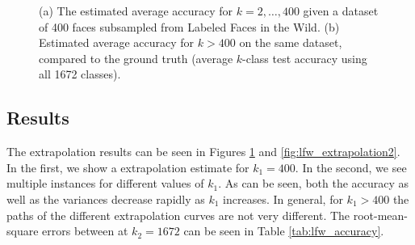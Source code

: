 \documentclass[twoside,11pt]{article}
\begin{document}
\begin{figure}
\begin{tabular}{cc}
\end{tabular}
\caption{(a) The estimated average accuracy for $k = 2,\hdots,
  400$ given a dataset of 400 faces subsampled from Labeled Faces in
  the Wild.  (b) Estimated average accuracy for $k > 400$ on the
  same dataset, compared to the ground truth (average $k$-class test accuracy
  using all 1672 classes).}
\label{fig:lfw_extrapolation1}
\end{figure}

\subsection{Results}

The extrapolation results can be seen in Figures \ref{fig:lfw_extrapolation1}  and \ref{fig:lfw_extrapolation2}. In the first, we show a extrapolation estimate for $k_1 = 400$. In the second, we see multiple instances for different values of $k_1$. As can be seen, both the accuracy as well as the variances decrease rapidly as $k_1$ increases. In general, for $k_1>400$ the paths of the different extrapolation curves are not very different. The root-mean-square errors between at $k_2=1672$ can be seen in Table \ref{tab:lfw_accuracy}.
\end{document}
